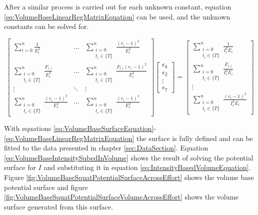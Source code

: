 After a similar process is carried out for each unknown constant, equation \ref{eq:VolumeBaseLinearRegMatrixEquation} can be used, and the unknown constants can be solved for.

\begin{equation}
    \label{eq:VolumeBaseLinearRegMatrixEquation}
	\left[
    \begin{matrix}
        \sum_{i=0}^n \frac{1}{E_i^2} &
        \dots &
        \sum_{\substack{i=0\\ t_i\in \{ T \}}}^n \frac{(r_i-1)^2}{E_i^2} \\

        \sum_{\substack{i=0\\ t_i\in \{ T \}}}^n  \frac{F_{l,i}}{E_i^2} &
        \dots &
        \sum_{\substack{i=0\\ t_i\in \{ T \}}}^n \frac{F_{l,i}(r_i-1)^2}{E_i^2}\\

        \vdots &
        \ddots &
        \vdots \\
        
        \sum_{\substack{i=0\\ t_i\in \{ T \}}}^n \frac{(r_i-1)^2}{E_i^2} &
        \dots &
        \sum_{\substack{i=0\\ t_i\in \{ T \}}}^n \frac{(r_i-1)^4}{E_i^2}
    \end{matrix}
    \right]
    \left[
    \begin{matrix}
        \epsilon_8 \\ \epsilon_2 \\ \vdots \\ \epsilon_7
    \end{matrix}
    \right]
    =
	\left[
    \begin{matrix}
        \sum_{\substack{i=0\\ t_i\in \{ T \}}}^n \frac{1}{I_i^2E_i} \\
        \sum_{\substack{i=0\\ t_i\in \{ T \}}}^n \frac{F_{l,i}}{I_i^2E_i} \\
        \vdots \\
        \sum_{\substack{i=0\\ t_i\in \{ T \}}}^n \frac{(r_i-1)^2}{I_i^2E_i}  
    \end{matrix}
    \right]
\end{equation}

With equations \ref{eq:VolumeBaseSurfaceEquation}- \ref{eq:VolumeBaseLinearRegMatrixEquation} the surface is fully defined and can be fitted to the data presented in chapter \ref{sec:DataSection}. Equation \ref{eq:VolumeBaseIntensitySubedInVolume} shows the result of solving the potential surface for $I$ and substituting it in equation \ref{eq:IntensityBasedVolumeEquation}. Figure \ref{fig:VolumeBaseSquatPotentialSurfaceAcrossEffort} shows the volume base potential surface and figure \ref{fig:VolumeBaseSquatPotentialSurfaceVolumeAcrossEffort} shows the volume surface generated from this surface.

